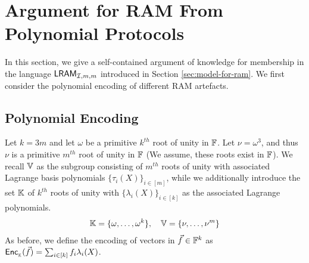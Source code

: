 \appendix

\section{Argument for RAM From Polynomial Protocols}\label{sec:poly-proto-ram-app}
In this section, we give a self-contained argument of knowledge for membership in the language
$\mathsf{LRAM}_{\mathcal{I},m,m}$ introduced in Section \ref{sec:model-for-ram}. We first consider the polynomial encoding
of different RAM artefacts.
\subsection{Polynomial Encoding}\label{subsec:poly-encoding}
Let $k=3m$ and let $\omega$ be a primitive $k^{th}$ root of unity in $\mathbb{F}$.
Let $\nu=\omega^3$, and thus $\nu$ is a primitive $m^{th}$ root of unity in $\mathbb{F}$ (We assume, these roots exist in $\mathbb{F}$).
We recall $\mathbb{V}$ as the subgroup consisting of $m^{th}$ roots of unity with associated Lagrange basis polynomials
$\{\tau_i(X)\}_{i\in [m]}$, while we additionally introduce the set $\mathbb{K}$ of $k^{th}$ roots of unity with
$\{\lambda_i(X)\}_{i\in [k]}$ as the associated Lagrange polynomials.
\begin{gather}\label{eq:interpolation-sets}
\mathbb{K} = \{\omega,\ldots,\omega^k\},\quad \mathbb{V} = \{\nu,\ldots,\nu^m\}
\end{gather}
As before, we define the encoding of vectors in $\vec{f}\in \mathbb{F}^k$ as $\mathsf{Enc}_{{}_{\mathbb{K}}}(\vec{f})=\sum_{i\in [k]}f_i\lambda_i(X)$.
